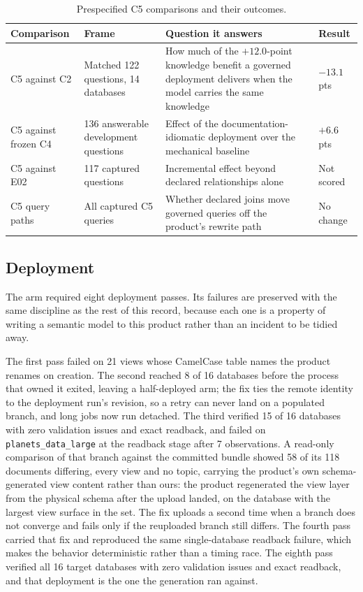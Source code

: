 \begin{table}[htbp]
\centering
\small
\caption{Prespecified C5 comparisons and their outcomes.}
\label{tab:c5plan}
\begin{tabular}{p{3.2cm}p{2.6cm}p{5.1cm}p{1.6cm}}
\toprule
Comparison & Frame & Question it answers & Result \\
\midrule
C5 against C2 & Matched 122 questions, 14 databases & How much of the $+12.0$-point knowledge benefit a governed deployment delivers when the model carries the same knowledge & $-13.1$ pts \\
C5 against frozen C4 & 136 answerable development questions & Effect of the documentation-idiomatic deployment over the mechanical baseline & $+6.6$ pts \\
C5 against E02 & 117 captured questions & Incremental effect beyond declared relationships alone & Not scored \\
C5 query paths & All captured C5 queries & Whether declared joins move governed queries off the product's rewrite path & No change \\
\bottomrule
\end{tabular}
\end{table}

\subsection{Deployment}
The arm required eight deployment passes. Its failures are preserved
with the same discipline as the rest of this record, because each one is a
property of writing a semantic model to this product rather than an incident to
be tidied away.

The first pass failed on 21 views whose CamelCase table names the product renames
on creation. The second reached 8 of 16 databases before the process that owned
it exited, leaving a half-deployed arm; the fix ties the remote identity to the
deployment run's revision, so a retry can never land on a populated branch, and
long jobs now run detached. The third verified 15 of 16 databases with zero
validation issues and exact readback, and failed on
\texttt{planets\_data\_large} at the readback stage after 7 observations. A
read-only comparison of that branch against the committed bundle showed 58 of its
118 documents differing, every view and no topic, carrying the product's own
schema-generated view content rather than ours: the product regenerated the view
layer from the physical schema after the upload landed, on the database with the
largest view surface in the set. The fix uploads a second time when a branch does
not converge and fails only if the reuploaded branch still differs. The fourth
pass carried that fix and reproduced the same single-database readback failure,
which makes the behavior deterministic rather than a timing race. The eighth
pass verified all 16 target databases with zero validation issues and exact
readback, and that deployment is the one the generation ran against.

